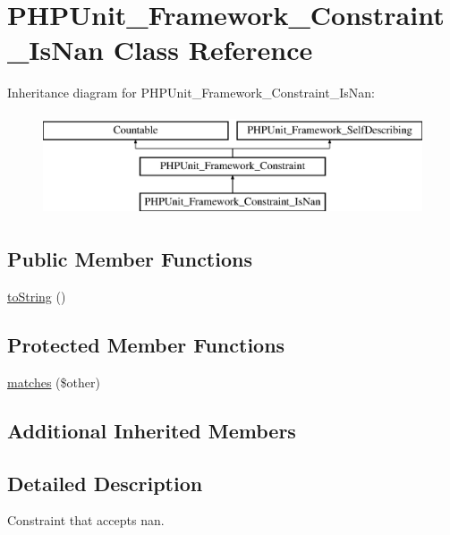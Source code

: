 \hypertarget{class_p_h_p_unit___framework___constraint___is_nan}{}\section{P\+H\+P\+Unit\+\_\+\+Framework\+\_\+\+Constraint\+\_\+\+Is\+Nan Class Reference}
\label{class_p_h_p_unit___framework___constraint___is_nan}
Inheritance diagram for P\+H\+P\+Unit\+\_\+\+Framework\+\_\+\+Constraint\+\_\+\+Is\+Nan\+:\begin{figure}[H]
\begin{center}
\leavevmode
\includegraphics[height=3.000000cm]{class_p_h_p_unit___framework___constraint___is_nan}
\end{center}
\end{figure}
\subsection*{Public Member Functions}
\begin{DoxyCompactItemize}
\item 
\mbox{\hyperlink{class_p_h_p_unit___framework___constraint___is_nan_a5558c5d549f41597377fa1ea8a1cefa3}{to\+String}} ()
\end{DoxyCompactItemize}
\subsection*{Protected Member Functions}
\begin{DoxyCompactItemize}
\item 
\mbox{\hyperlink{class_p_h_p_unit___framework___constraint___is_nan_a9c9c337de483bbdbb9fa249a6c7c9cc5}{matches}} (\$other)
\end{DoxyCompactItemize}
\subsection*{Additional Inherited Members}


\subsection{Detailed Description}
Constraint that accepts nan. 

